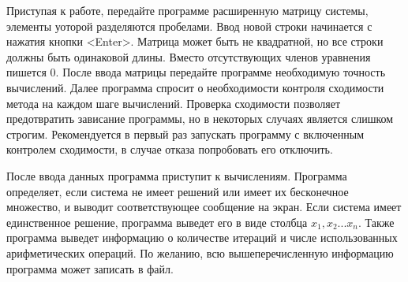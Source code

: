 Приступая к работе, передайте программе расширенную матрицу системы, элементы уоторой разделяются пробелами. Ввод новой строки начинается с нажатия кнопки <Enter>. Матрица может быть не квадратной, но все строки должны быть одинаковой длины. Вместо отсутствующих членов уравнения пишется 0. После ввода матрицы передайте программе необходимую точность вычислений. Далее программа спросит о необходимости контроля сходимости метода на каждом шаге вычислений. Проверка сходимости позволяет предотвратить зависание программы, но в некоторых случаях является слишком строгим. Рекомендуется в первый раз запускать программу с включенным контролем сходимости, в случае отказа попробовать его отключить.

После ввода данных программа приступит к вычислениям. Программа определяет, если система не имеет решений или имеет их бесконечное множество, и выводит соответствующее сообщение на экран. Если система имеет единственное решение, программа выведет его в виде столбца $x_1,x_2...x_n$. Также программа выведет информацию о количестве итераций и числе использованных арифметических операций. По желанию, всю вышеперечисленную информацию программа может записать в файл.


